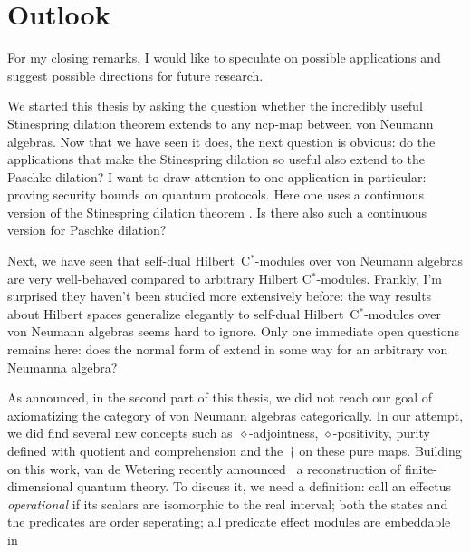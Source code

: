 \documentclass[b]{subfiles}
\begin{document}
\chapter{Outlook}
\begin{parsec}%
\begin{point}%
For my closing remarks, I would like to speculate
    on possible applications
    and suggest possible
        directions for future research.

We started this thesis by asking the question
    whether the incredibly useful Stinespring dilation theorem
    extends to any ncp-map between von Neumann algebras.
Now that we have seen it does, the next question is obvious:
    do the applications that make the Stinespring dilation so useful
    also extend to the Paschke dilation?
I want to draw attention to one application in particular:
    proving security bounds on quantum protocols.
Here one uses a continuous version
    of the Stinespring dilation theorem \cite{werner2}.
Is there also such a continuous version for Paschke dilation?
\begin{point}%
Next, we have seen that self-dual Hilbert~C$^*$-modules
    over von Neumann algebras
    are very well-behaved compared
    to arbitrary Hilbert C$^*$-modules.
    Frankly, I'm surprised they haven't been studied
        more extensively before:
        the way results about Hilbert spaces
        generalize elegantly to self-dual Hilbert~C$^*$-modules
        over von Neumann algebras seems hard to ignore.
Only one immediate open questions remains here:
    does the normal form of 
    extend in some way for an arbitrary von Neumanna algebra?
\end{point}
\begin{point}%
As announced, in the second part of this thesis, we did not reach
    our goal of axiomatizing the category of von Neumann algebras
    categorically.
In our attempt, we did find several new concepts
    such as~$\diamond$-adjointness, $\diamond$-positivity,
        purity defined with quotient and comprehension and
        the~$\dagger$ on these pure maps.
Building on this work,
    van de Wetering recently announced~\cite{wetering}
    a reconstruction of finite-dimensional quantum theory.
    To discuss it, we need a definition: call an effectus \emph{operational}
        if its scalars are isomorphic to the real interval;
        both the states and the predicates are order seperating;
        all predicate effect modules are embeddable in

\end{point}
\end{point}
\end{parsec}
\end{document}
